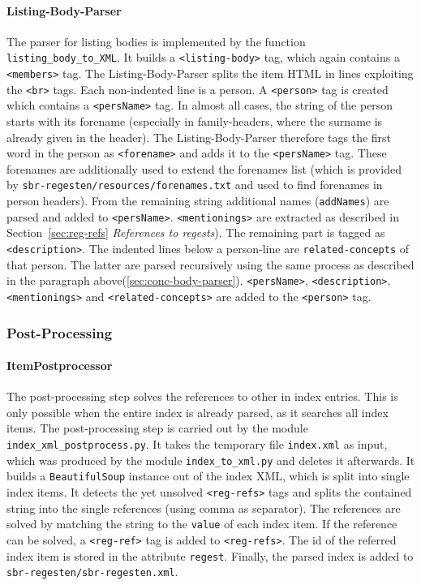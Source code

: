\paragraph{Listing-Body-Parser}
The parser for listing bodies is implemented by the function
\texttt{listing\_body\_to\_XML}. It builds a \texttt{<listing-body>}
tag, which again contains a \texttt{<members>} tag. The
Listing-Body-Parser splits the item HTML in lines exploiting the
\texttt{<br>} tags. Each non-indented line is a person. A
\texttt{<person>} tag is created which contains a \texttt{<persName>}
tag. In almost all cases, the string of the person starts with its
forename (especially in family-headers, where the surname is already
given in the header). The Listing-Body-Parser therefore tags the first
word in the person as \texttt{<forename>} and adds it to the
\texttt{<persName>} tag. These forenames are additionally used to
extend the forenames list (which is provided by
\texttt{sbr-regesten/resources/forenames.txt} and used to find
forenames in person headers). From the remaining string additional
names (\texttt{addNames}) are parsed and added to \texttt{<persName>}.
\texttt{<mentionings>} are extracted as described in
Section~\ref{sec:reg-refs} \textit{References to regests}). The
remaining part is tagged as \texttt{<description>}. The indented lines
below a person-line are \texttt{related-concepts} of that person. The
latter are parsed recursively using the same process as described in
the paragraph above(\ref{sec:conc-body-parser}). \texttt{<persName>},
\texttt{<description>}, \texttt{<mentionings>} and
\texttt{<related-concepts>} are added to the \texttt{<person>} tag.

\subsubsection{Post-Processing}

\paragraph{ItemPostprocessor}
\label{sec:postproc}
The post-processing step solves the references to other in index
entries. This is only possible when the entire index is already
parsed, as it searches all index items. The post-processing step is
carried out by the module \texttt{index\_xml\_postprocess.py}. It
takes the temporary file \texttt{index.xml} as input, which was
produced by the module \texttt{index\_to\_xml.py} and deletes it
afterwards. It builds a \texttt{BeautifulSoup} instance out of the
index XML, which is split into single index items. It detects the yet
unsolved \texttt{<reg-refs>} tags and splits the contained string into
the single references (using comma as separator). The references are
solved by matching the string to the \texttt{value} of each index
item. If the reference can be solved, a \texttt{<reg-ref>} tag is
added to \texttt{<reg-refs>}. The id of the referred index item is
stored in the attribute \texttt{regest}. Finally, the parsed index is
added to \texttt{sbr-regesten/sbr-regesten.xml}.

